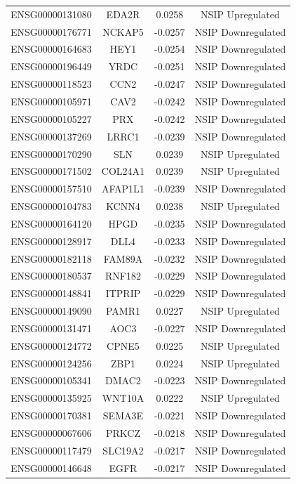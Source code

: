 \documentclass[
]{article}
\begin{document}
\begin{singlespace}
\begin{longtable}[t]{lccc}
\addlinespace
ENSG00000131080 & EDA2R & 0.0258 & NSIP Upregulated\\
ENSG00000176771 & NCKAP5 & -0.0257 & NSIP Downregulated\\
ENSG00000164683 & HEY1 & -0.0254 & NSIP Downregulated\\
ENSG00000196449 & YRDC & -0.0251 & NSIP Downregulated\\
ENSG00000118523 & CCN2 & -0.0247 & NSIP Downregulated\\
\addlinespace
ENSG00000105971 & CAV2 & -0.0242 & NSIP Downregulated\\
ENSG00000105227 & PRX & -0.0242 & NSIP Downregulated\\
ENSG00000137269 & LRRC1 & -0.0239 & NSIP Downregulated\\
ENSG00000170290 & SLN & 0.0239 & NSIP Upregulated\\
ENSG00000171502 & COL24A1 & 0.0239 & NSIP Upregulated\\
\addlinespace
ENSG00000157510 & AFAP1L1 & -0.0239 & NSIP Downregulated\\
ENSG00000104783 & KCNN4 & 0.0238 & NSIP Upregulated\\
ENSG00000164120 & HPGD & -0.0235 & NSIP Downregulated\\
ENSG00000128917 & DLL4 & -0.0233 & NSIP Downregulated\\
ENSG00000182118 & FAM89A & -0.0232 & NSIP Downregulated\\
\addlinespace
ENSG00000180537 & RNF182 & -0.0229 & NSIP Downregulated\\
ENSG00000148841 & ITPRIP & -0.0229 & NSIP Downregulated\\
ENSG00000149090 & PAMR1 & 0.0227 & NSIP Upregulated\\
ENSG00000131471 & AOC3 & -0.0227 & NSIP Downregulated\\
ENSG00000124772 & CPNE5 & 0.0225 & NSIP Upregulated\\
\addlinespace
ENSG00000124256 & ZBP1 & 0.0224 & NSIP Upregulated\\
ENSG00000105341 & DMAC2 & -0.0223 & NSIP Downregulated\\
ENSG00000135925 & WNT10A & 0.0222 & NSIP Upregulated\\
ENSG00000170381 & SEMA3E & -0.0221 & NSIP Downregulated\\
ENSG00000067606 & PRKCZ & -0.0218 & NSIP Downregulated\\
\addlinespace
ENSG00000117479 & SLC19A2 & -0.0217 & NSIP Downregulated\\
ENSG00000146648 & EGFR & -0.0217 & NSIP Downregulated\\

\end{longtable}
\end{singlespace}
\end{document}
